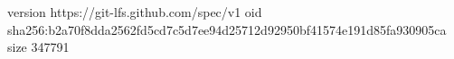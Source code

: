 version https://git-lfs.github.com/spec/v1
oid sha256:b2a70f8dda2562fd5cd7c5d7ee94d25712d92950bf41574e191d85fa930905ca
size 347791
